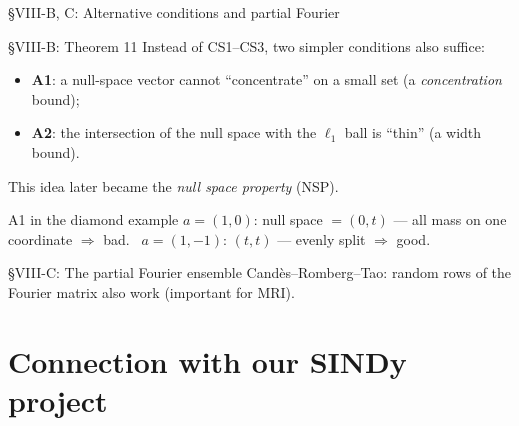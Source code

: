 \documentclass[aspectratio=169,11pt]{beamer}
\newcommand{\en}[1]{\textit{#1}}          %
\begin{document}
\begin{frame}{\S VIII-B, C: Alternative conditions and partial Fourier}
  \begin{block}{\S VIII-B: Theorem 11}
    Instead of CS1--CS3, two simpler conditions also suffice:
    \begin{itemize}
      \item \textbf{A1}: a null-space vector cannot ``concentrate'' on a small set (a \en{concentration} bound);
      \item \textbf{A2}: the intersection of the null space with the $\ell_1$ ball is ``thin'' (a width bound).
    \end{itemize}
    {\footnotesize This idea later became the \en{null space property} (NSP).}
  \end{block}
  \begin{exampleblock}{A1 in the diamond example}
    $a=(1,0)$: null space $=(0,t)$ --- all mass on one coordinate $\Rightarrow$ bad. \ $a=(1,-1)$: $(t,t)$ --- evenly split $\Rightarrow$ good.
  \end{exampleblock}
  \begin{block}{\S VIII-C: The partial Fourier ensemble}
    Cand\`es--Romberg--Tao: random rows of the Fourier matrix also work (important for MRI).
  \end{block}
\end{frame}

\section{Connection with our SINDy project}
\end{document}
